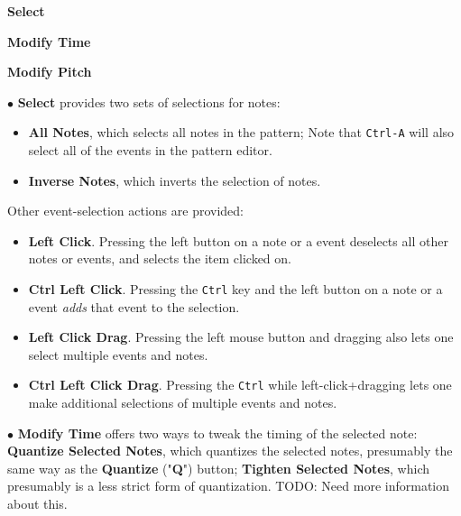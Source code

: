    \begin{enumber}
      \item \textbf{Select}
      \item \textbf{Modify Time}
      \item \textbf{Modify Pitch}
   \end{enumber}

   $\bullet$ \textbf{Select} provides two sets of selections for notes:
   \begin{itemize}
      \item \textbf{All Notes}, which selects all notes in the pattern;
         Note that  \texttt{Ctrl-A} will also select
         all of the events in the pattern editor.
      \item \textbf{Inverse Notes}, which inverts the selection of notes.
   \end{itemize}

   Other event-selection actions are provided:

   \begin{itemize}
      \item {}
         \textbf{Left Click}.
         Pressing the left button on a note or a event deselects all other
         notes or events, and selects the item clicked on.
      \item {}
         \textbf{Ctrl Left Click}.
         Pressing the \texttt{Ctrl} key and the left button on a note or a
         event \textsl{adds} that event to the selection.
      \item {}
         \textbf{Left Click Drag}.
         Pressing the left mouse button and dragging also lets one
         select multiple events and notes.
      \item {}
         \textbf{Ctrl Left Click Drag}.
         Pressing the \texttt{Ctrl} while left-click+dragging lets one
         make additional selections of multiple events and notes.
   \end{itemize}

   $\bullet$ \textbf{Modify Time} offers two ways to tweak the timing of the
   selected note:
   \textbf{Quantize Selected Notes}, which quantizes the selected
   notes, presumably the same way as the \textbf{Quantize} ("\textbf{Q}")
   button; \textbf{Tighten Selected Notes}, which presumably is a less
   strict form of quantization.
   TODO:  Need more information about this.

